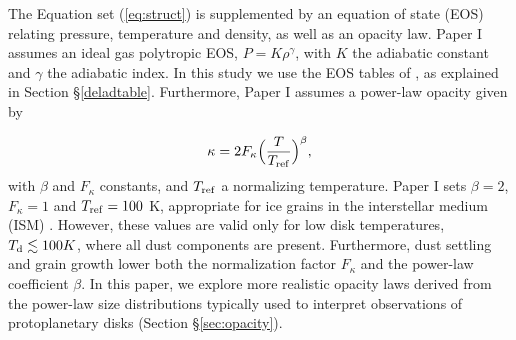 \documentclass[apj]{emulateapj}
\newcommand{\di}{_{\rm d}}
\begin{document}
The Equation set (\ref{eq:struct}) is supplemented by an equation of state (EOS) relating pressure, temperature and density, as well as an opacity law. Paper I assumes an ideal gas polytropic EOS, $P=K\rho^{\gamma}$, with $K$ the adiabatic constant and $\gamma$ the adiabatic index. In this study we use the EOS tables of \citet{saumon95}, as explained in Section \S\ref{deladtable}. Furthermore, Paper I assumes a power-law opacity given by

\begin{equation}
\label{eq:opacitylaw}
\kappa=2 F_{\kappa} \Big(\frac{T}{T_{\rm ref}}\Big)^{\beta},
\end{equation}  
\noindent with $\beta$ and $F_{\kappa}$ constants, and $T_{\rm{ref}}$ a normalizing temperature. Paper I sets $\beta=2$, $F_{\kappa}=1$ and $T_{\rm ref}=100$ K, appropriate for ice grains in the interstellar medium (ISM) \citep{bell94}. However, these values are valid only for low disk temperatures, $T\di \lesssim 100 K$, where all dust components are present. Furthermore, dust settling and grain growth lower both the normalization factor $F_{\kappa}$ and the power-law coefficient $\beta$. In this paper, we explore more realistic opacity laws derived from the power-law size distributions typically used to interpret observations of protoplanetary disks (Section \S\ref{sec:opacity}). 



\end{document}
